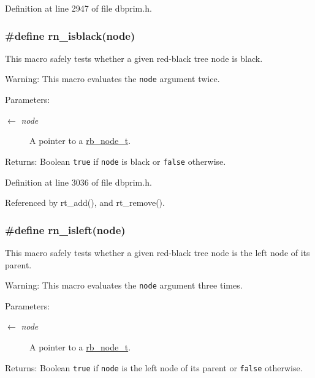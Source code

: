 Definition at line 2947 of file dbprim.h.\hypertarget{group__dbprim__rbtree_ga40}{
\subsubsection[rn\_\-isblack]{\setlength{\rightskip}{0pt plus 5cm}\#define rn\_\-isblack(node)}}
\label{group__dbprim__rbtree_ga40}


This macro safely tests whether a given red-black tree node is black.

\begin{Desc}
\item[Warning:]This macro evaluates the {\tt node} argument twice.\end{Desc}
\begin{Desc}
\item[Parameters:]
\begin{description}
\item[\mbox{$\leftarrow$} {\em node}]A pointer to a \hyperlink{group__dbprim__rbtree_ga1}{rb\_\-node\_\-t}.\end{description}
\end{Desc}
\begin{Desc}
\item[Returns:]Boolean {\tt true} if {\tt node} is black or {\tt false} otherwise.\end{Desc}


Definition at line 3036 of file dbprim.h.

Referenced by rt\_\-add(), and rt\_\-remove().\hypertarget{group__dbprim__rbtree_ga42}{
\subsubsection[rn\_\-isleft]{\setlength{\rightskip}{0pt plus 5cm}\#define rn\_\-isleft(node)}}
\label{group__dbprim__rbtree_ga42}


This macro safely tests whether a given red-black tree node is the left node of its parent.

\begin{Desc}
\item[Warning:]This macro evaluates the {\tt node} argument three times.\end{Desc}
\begin{Desc}
\item[Parameters:]
\begin{description}
\item[\mbox{$\leftarrow$} {\em node}]A pointer to a \hyperlink{group__dbprim__rbtree_ga1}{rb\_\-node\_\-t}.\end{description}
\end{Desc}
\begin{Desc}
\item[Returns:]Boolean {\tt true} if {\tt node} is the left node of its parent or {\tt false} otherwise.\end{Desc}



